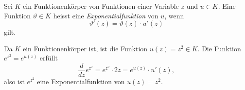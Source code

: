 \begin{definition}
\label{buch:holomorph:holomorph:definition:algexponential}
Sei $K$ ein Funktionenkörper von Funktionen einer Variable $z$ und $u\in K$.
Eine Funktion $\vartheta\in K$ heisst eine \emph{Exponentialfunktion} von $u$,
%
wenn
\[
\vartheta'(z) = \vartheta(z)\cdot u'(z)
\]
gilt.
\end{definition}

\begin{beispiel}
Da $K$ ein Funktionenkörper ist, ist die Funktion $u(z)=z^2\in K$.
Die Funktion $e^{z^2}=e^{u(z)}$ erfüllt
\[
\frac{d}{dz} e^{z^2}
=
e^{z^2}\cdot 2z
=
e^{u(z)}\cdot u'(z),
\]
also ist $e^{z^2}$ eine Exponentialfunktion von $u(z)=z^2$.
\end{beispiel}

